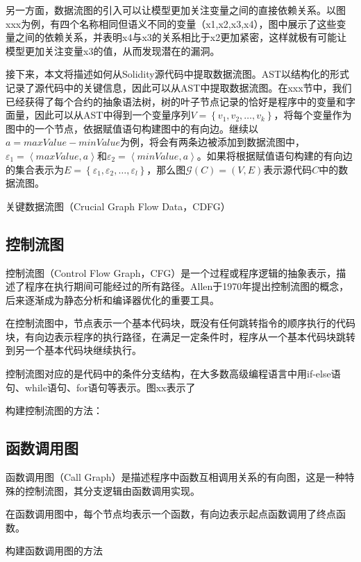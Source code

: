 另一方面，数据流图的引入可以让模型更加关注变量之间的直接依赖关系。以图xxx为例，有四个名称相同但语义不同的变量（x1,x2,x3,x4），图中展示了这些变量之间的依赖关系，并表明x4与x3的关系相比于x2更加紧密，这样就极有可能让模型更加关注变量x3的值，从而发现潜在的漏洞。

接下来，本文将描述如何从Solidity源代码中提取数据流图。AST以结构化的形式记录了源代码中的关键信息，因此可以从AST中提取数据流图。在xxx节中，我们已经获得了每个合约的抽象语法树，树的叶子节点记录的恰好是程序中的变量和字面量，因此可以从AST中得到一个变量序列$V=\left\{v_1, v_2, \ldots, v_k\right\}$，将每个变量作为图中的一个节点，依据赋值语句构建图中的有向边。继续以$a=maxValue-minValue$为例，将会有两条边被添加到数据流图中，$\varepsilon_1=\left\langle maxValue, a\right\rangle$和$\varepsilon_2=\left\langle minValue, a\right\rangle$。如果将根据赋值语句构建的有向边的集合表示为$E=\left\{\varepsilon_1, \varepsilon_2, \ldots, \varepsilon_l\right\}$，那么图$\mathcal{G}(C)=(V, E)$表示源代码$C$中的数据流图。


关键数据流图（Crucial Graph Flow Data，CDFG）
\subsection{控制流图}

控制流图（Control Flow Graph，CFG）是一个过程或程序逻辑的抽象表示，描述了程序在执行期间可能经过的所有路径。Allen于1970年提出控制流图的概念\cite{allencfg}，后来逐渐成为静态分析和编译器优化的重要工具。

在控制流图中，节点表示一个基本代码块，既没有任何跳转指令的顺序执行的代码块，有向边表示程序的执行路径，在满足一定条件时，程序从一个基本代码块跳转到另一个基本代码块继续执行。

控制流图对应的是代码中的条件分支结构，在大多数高级编程语言中用if-else语句、while语句、for语句等表示。图xx表示了

构建控制流图的方法：
\subsection{函数调用图}
函数调用图（Call Graph）是描述程序中函数互相调用关系的有向图，这是一种特殊的控制流图，其分支逻辑由函数调用实现。

在函数调用图中，每个节点均表示一个函数，有向边表示起点函数调用了终点函数。

构建函数调用图的方法



